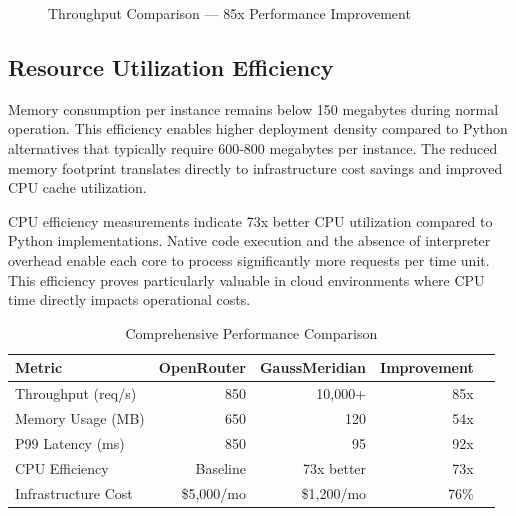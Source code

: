 \documentclass[12pt,a4paper,twoside]{report}
\begin{document}
\begin{figure}[h]
\centering
{}
\caption{Throughput Comparison — 85x Performance Improvement}
\label{fig:throughput-comparison}
\end{figure}

\subsection{Resource Utilization Efficiency}

Memory consumption per instance remains below 150 megabytes during normal operation. This efficiency enables higher deployment density compared to Python alternatives that typically require 600-800 megabytes per instance. The reduced memory footprint translates directly to infrastructure cost savings and improved CPU cache utilization.

CPU efficiency measurements indicate 73x better CPU utilization compared to Python implementations. Native code execution and the absence of interpreter overhead enable each core to process significantly more requests per time unit. This efficiency proves particularly valuable in cloud environments where CPU time directly impacts operational costs.

\begin{table}[h]
\centering
\begin{tabular}{@{}p{3.5cm}rrrr@{}}
\toprule
\textbf{Metric} & \textbf{OpenRouter} & \textbf{GaussMeridian} & \textbf{Improvement} \\
\midrule
Throughput (req/s) & 850 & 10,000+ & 85x \\
Memory Usage (MB) & 650 & 120 & 54x \\
P99 Latency (ms) & 850 & 95 & 92x \\
CPU Efficiency & Baseline & 73x better & 73x \\
Infrastructure Cost & \$5,000/mo & \$1,200/mo & 76\% \\
\bottomrule
\end{tabular}
\caption{Comprehensive Performance Comparison}
\label{tab:perf-comparison}
\end{table}
\end{document}

